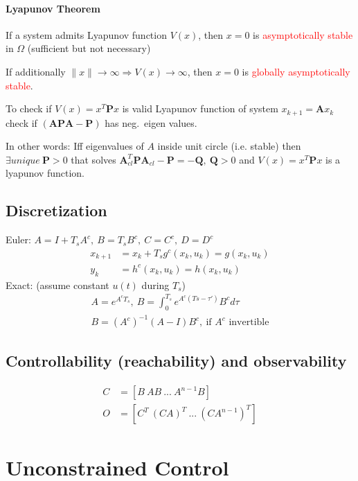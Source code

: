 \documentclass[landscape,a4paper,8pt]{scrartcl}
\renewcommand{\implies}{\Rightarrow}
\newcommand{\remph}[1]{{\textcolor{red}{#1}}}
\newcommand\vA{\bm{A}}
\newcommand\vP{\bm{P}}
\newcommand\vQ{\bm{Q}}
\begin{document}
\begin{multicols*}{3}
\paragraph{Lyapunov Theorem}
If a system admits Lyapunov function $V(x)$, then $x=0$ is \remph{asymptotically stable} in $\Omega$ (sufficient but not necessary)

If additionally $\lVert x \rVert \to \infty \implies V(x) \to \infty$, then $x=0$ is \remph{globally asymptotically stable}.

To check if $V(x) = x^T\vP x$ is valid Lyapunov function of system $x_{k+1} = \vA x_k$ check if $(\vA\vP\vA-\vP)$ has neg.\ eigen values.

In other words: Iff eigenvalues of $A$ inside unit circle (i.e. stable) then $\exists unique \ \vP>0$ that solves $\vA_{cl}^T\vP\vA_{cl}-\vP = -\vQ,\ \vQ > 0$ and $V(x) = x^T\vP x$ is a lyapunov function.

\subsection{Discretization}
Euler: $A = I + T_s A^c ,\ B = T_s B^c ,\ C = C^c ,\ D = D^c $
\begin{align*}
x_{k + 1} &= x_k + T_s g^c(x_k,u_k) = g(x_k,u_k) \\
y_{k}     &= h^c(x_k, u_k) = h(x_k, u_k)
\end{align*}
Exact: (assume constant $u(t)$ during $T_s$)
\begin{align*}
A = e^{A^cT_s},\ B = \int_0^{T_s} e^{A^c(Ts-\tau')}B^cd\tau \\
B=(A^c)^{-1}(A-I)B^c,\ \text{if $A^c$ invertible}
\end{align*}

\subsection{Controllability (reachability) and observability}
\begin{align*}
C &= [B \ AB \ ... \ A^{n-1}B] \\
O &= [C^T \ (CA)^T \ ... \ (CA^{n-1})^T]
\end{align*}

\section{Unconstrained Control}

\end{multicols*}
\end{document}
